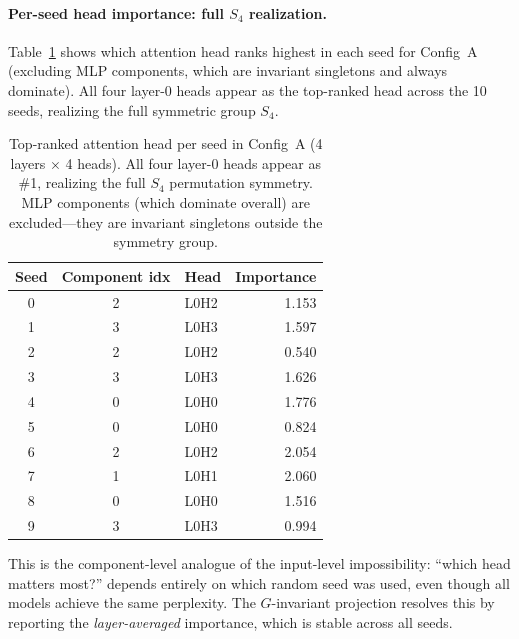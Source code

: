 \documentclass{article}
\begin{document}
\paragraph{Per-seed head importance: full $S_4$ realization.}
Table~\ref{tab:tinystories-seeds} shows which attention head ranks highest in each seed for Config~A (excluding MLP components, which are invariant singletons and always dominate). All four layer-0 heads appear as the top-ranked head across the 10 seeds, realizing the full symmetric group $S_4$.

\begin{table}[ht]
\centering
\caption{Top-ranked attention head per seed in Config~A (4 layers $\times$ 4 heads). All four layer-0 heads appear as \#1, realizing the full $S_4$ permutation symmetry. MLP components (which dominate overall) are excluded---they are invariant singletons outside the symmetry group.}
\label{tab:tinystories-seeds}
\small
\begin{tabular}{cclr}
\toprule
\textbf{Seed} & \textbf{Component idx} & \textbf{Head} & \textbf{Importance} \\
\midrule
0 & 2 & L0H2 & 1.153 \\
1 & 3 & L0H3 & 1.597 \\
2 & 2 & L0H2 & 0.540 \\
3 & 3 & L0H3 & 1.626 \\
4 & 0 & L0H0 & 1.776 \\
5 & 0 & L0H0 & 0.824 \\
6 & 2 & L0H2 & 2.054 \\
7 & 1 & L0H1 & 2.060 \\
8 & 0 & L0H0 & 1.516 \\
9 & 3 & L0H3 & 0.994 \\
\bottomrule
\end{tabular}
\end{table}

This is the component-level analogue of the input-level impossibility: ``which head matters most?'' depends entirely on which random seed was used, even though all models achieve the same perplexity. The $G$-invariant projection resolves this by reporting the \emph{layer-averaged} importance, which is stable across all seeds.
\end{document}
